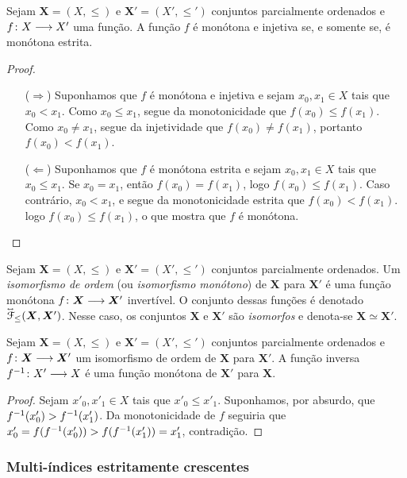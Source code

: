 \begin{exercise}
	Sejam $\bm X = (X,\leq)$ e $\bm X' = (X',\leq')$ conjuntos parcialmente ordenados e ${f}\colon {X} \longrightarrow {X'}$ uma função. A função $f$ é monótona e injetiva se, e somente se, é monótona estrita.
\end{exercise}
\begin{proof}
	\begin{enumerate}
		\item [($\Rightarrow$)] Suponhamos que $f$ é monótona e injetiva e sejam $x_0,x_1 \in X$ tais que $x_0 < x_1$. Como $x_0 \leq x_1$, segue da monotonicidade que $f(x_0) \leq f(x_1)$. Como $x_0 \neq x_1$, segue da injetividade que $f(x_0) \neq f(x_1)$, portanto $f(x_0) < f(x_1)$.
		
		\item [($\Leftarrow$)] Suponhamos que $f$ é monótona estrita e sejam $x_0,x_1 \in X$ tais que $x_0 \leq x_1$. Se $x_0 = x_1$, então $f(x_0) = f(x_1)$, logo $f(x_0) \leq f(x_1)$. Caso contrário, $x_0 < x_1$, e segue da monotonicidade estrita que $f(x_0) < f(x_1)$. logo $f(x_0) \leq f(x_1)$, o que mostra que $f$ é monótona.
	\end{enumerate}
\end{proof}

\begin{definition}
	Sejam $\bm X = (X,\leq)$ e $\bm X' = (X',\leq')$ conjuntos parcialmente ordenados. Um \emph{isomorfismo de ordem} (ou \emph{isomorfismo monótono}) de $\bm X$ para $\bm X'$ é uma função monótona ${f}\colon {\bm X} \longrightarrow {\bm X'}$ invertível. O conjunto dessas funções é denotado $\accentset{\leftrightarrow}{\mathcal{F}}_\leq(\bm X, \bm X')$. Nesse caso, os conjuntos $\bm X$ e $\bm X'$ são \emph{isomorfos} e denota-se $\bm X \simeq \bm X'$.
\end{definition}

\begin{proposition}
	Sejam $\bm X = (X,\leq)$ e $\bm X' = (X',\leq')$ conjuntos parcialmente ordenados e ${f}\colon {\bm X} \longrightarrow {\bm X'}$ um isomorfismo de ordem de $\bm X$ para $\bm X'$. A função inversa ${f^{-1}}\colon {X'} \longrightarrow {X}$ é uma função monótona de $\bm X'$ para $\bm X$.
\end{proposition}
\begin{proof}
	Sejam $x'_0,x'_1 \in X$ tais que $x'_0 \leq x'_1$. Suponhamos, por absurdo, que $f^{-1}(x'_0) > f^{-1}(x'_1)$. Da monotonicidade de $f$ seguiria que $x'_0 = f(f^{-1}(x'_0)) > f(f^{-1}(x'_1)) = x'_1$, contradição.
\end{proof}

\subsubsection{Multi-índices estritamente crescentes}

